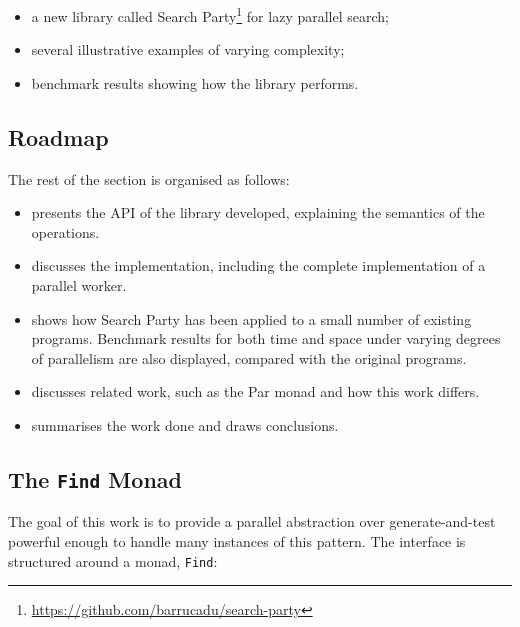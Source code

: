 \begin{itemize}
  \item a new library called Search
    Party\footnote{\url{https://github.com/barrucadu/search-party}}
    for lazy parallel search;

  \item several illustrative examples of varying complexity;

  \item benchmark results showing how the library performs.
\end{itemize}

\subsection*{Roadmap}

The rest of the section is organised as follows:

\begin{itemize}
  \item {} presents the API of the library developed, explaining
    the semantics of the operations.

  \item {} discusses the implementation, including the
    complete implementation of a parallel worker.

  \item {} shows how Search Party has been applied to a
    small number of existing programs. Benchmark results for both time and space
    under varying degrees of parallelism are also displayed, compared
    with the original programs.

  \item {} discusses related work, such as the Par
    monad\cite{par} and how this work differs.

  \item {} summarises the work done and draws conclusions.
\end{itemize}

\subsection{The \texttt{Find} Monad}
\label{sec:prelims-searchparty-api}

The goal of this work is to provide a parallel abstraction over
generate-and-test powerful enough to handle many instances of this
pattern. The interface is structured around a monad, \verb|Find|:

